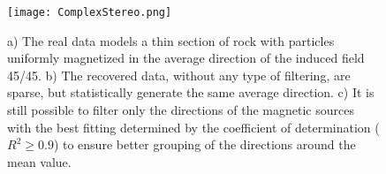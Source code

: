\begin{singlespace}
\begin{figure}[hbpt]
\centering
\texttt{[image: ComplexStereo.png]}
\caption{a) The real data models a thin section of rock with particles uniformly magnetized in the average direction of the induced field 45\textdegree/45\textdegree. b) The recovered data, without any type of filtering, are sparse, but statistically generate the same average direction. c) It is still possible to filter only the directions of the magnetic sources with the best fitting determined by the coefficient of determination ($R^ 2 \geq 0.9$) to ensure better grouping of the directions around the mean value.}
\label{fig:ComplexSynthetic3}
\end{figure}

\end{singlespace}